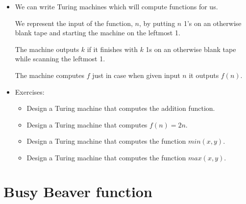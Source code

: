 \documentclass[justified]{tufte-handout}
\begin{document}
\begin{itemize}
\item We can write Turing machines which will compute functions for us. 

We represent the input of the function, $n$, by putting $n$ 1's on an otherwise blank tape and starting the machine on the leftmost 1.

The machine outputs $k$ if it finishes with $k$ 1s on an otherwise blank tape while scanning the leftmost 1.

The machine computes $f$ just in case when given input $n$ it outputs $f(n)$.



\item Exercises: 


\begin{itemize}

\item Design a Turing machine that computes the addition function.


\item Design a Turing machine that computes $f(n) =2n$. 

\item Design a Turing machine that computes the function $min(x,y)$.

\item Design a Turing machine that computes the function $max(x,y)$.

\end{itemize}


\end{itemize}



\section{Busy Beaver function}
\end{document}
